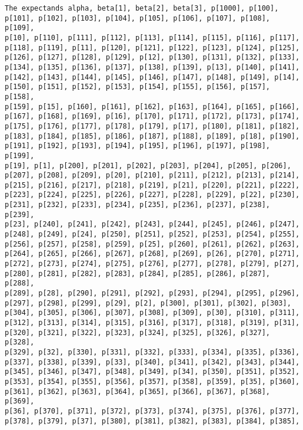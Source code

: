 \documentclass[
  letterpaper,
  DIV=11,
  numbers=noendperiod]{scrartcl}
\begin{document}
\begin{verbatim}
The expectands alpha, beta[1], beta[2], beta[3], p[1000], p[100],
p[101], p[102], p[103], p[104], p[105], p[106], p[107], p[108], p[109],
p[10], p[110], p[111], p[112], p[113], p[114], p[115], p[116], p[117],
p[118], p[119], p[11], p[120], p[121], p[122], p[123], p[124], p[125],
p[126], p[127], p[128], p[129], p[12], p[130], p[131], p[132], p[133],
p[134], p[135], p[136], p[137], p[138], p[139], p[13], p[140], p[141],
p[142], p[143], p[144], p[145], p[146], p[147], p[148], p[149], p[14],
p[150], p[151], p[152], p[153], p[154], p[155], p[156], p[157], p[158],
p[159], p[15], p[160], p[161], p[162], p[163], p[164], p[165], p[166],
p[167], p[168], p[169], p[16], p[170], p[171], p[172], p[173], p[174],
p[175], p[176], p[177], p[178], p[179], p[17], p[180], p[181], p[182],
p[183], p[184], p[185], p[186], p[187], p[188], p[189], p[18], p[190],
p[191], p[192], p[193], p[194], p[195], p[196], p[197], p[198], p[199],
p[19], p[1], p[200], p[201], p[202], p[203], p[204], p[205], p[206],
p[207], p[208], p[209], p[20], p[210], p[211], p[212], p[213], p[214],
p[215], p[216], p[217], p[218], p[219], p[21], p[220], p[221], p[222],
p[223], p[224], p[225], p[226], p[227], p[228], p[229], p[22], p[230],
p[231], p[232], p[233], p[234], p[235], p[236], p[237], p[238], p[239],
p[23], p[240], p[241], p[242], p[243], p[244], p[245], p[246], p[247],
p[248], p[249], p[24], p[250], p[251], p[252], p[253], p[254], p[255],
p[256], p[257], p[258], p[259], p[25], p[260], p[261], p[262], p[263],
p[264], p[265], p[266], p[267], p[268], p[269], p[26], p[270], p[271],
p[272], p[273], p[274], p[275], p[276], p[277], p[278], p[279], p[27],
p[280], p[281], p[282], p[283], p[284], p[285], p[286], p[287], p[288],
p[289], p[28], p[290], p[291], p[292], p[293], p[294], p[295], p[296],
p[297], p[298], p[299], p[29], p[2], p[300], p[301], p[302], p[303],
p[304], p[305], p[306], p[307], p[308], p[309], p[30], p[310], p[311],
p[312], p[313], p[314], p[315], p[316], p[317], p[318], p[319], p[31],
p[320], p[321], p[322], p[323], p[324], p[325], p[326], p[327], p[328],
p[329], p[32], p[330], p[331], p[332], p[333], p[334], p[335], p[336],
p[337], p[338], p[339], p[33], p[340], p[341], p[342], p[343], p[344],
p[345], p[346], p[347], p[348], p[349], p[34], p[350], p[351], p[352],
p[353], p[354], p[355], p[356], p[357], p[358], p[359], p[35], p[360],
p[361], p[362], p[363], p[364], p[365], p[366], p[367], p[368], p[369],
p[36], p[370], p[371], p[372], p[373], p[374], p[375], p[376], p[377],
p[378], p[379], p[37], p[380], p[381], p[382], p[383], p[384], p[385],

\end{verbatim}
\end{document}
